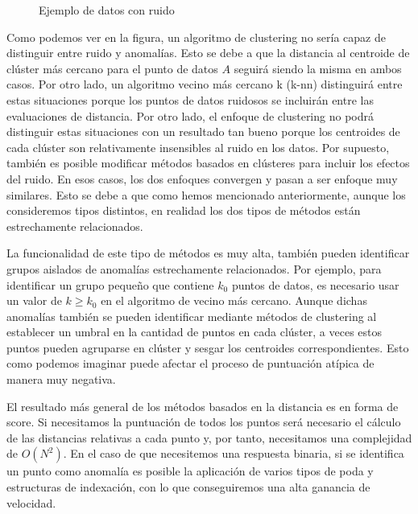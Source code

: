 \begin{figure}[h]
    \caption{\label{fig:my-label} Ejemplo de datos con ruido}
\end{figure}

Como podemos ver en la figura, un algoritmo de clustering no sería capaz de 
distinguir entre ruido y anomalías. Esto se debe a que la distancia al centroide 
de clúster más cercano para el punto de datos $A$ seguirá siendo la misma en 
ambos casos. Por otro lado, un algoritmo vecino más cercano k (k-nn) distinguirá entre 
estas situaciones porque los puntos de datos ruidosos se incluirán entre 
las evaluaciones de distancia. Por otro lado, el enfoque de clustering no 
podrá distinguir estas situaciones con un resultado tan bueno porque los 
centroides de cada clúster son relativamente insensibles al ruido en 
los datos. Por supuesto, también es posible modificar métodos basados en
clústeres para incluir los efectos del ruido. En esos casos, los dos
enfoques convergen y pasan a ser enfoque muy similares. Esto se debe a 
que como hemos mencionado anteriormente, aunque los consideremos tipos distintos,
en realidad los dos tipos de métodos están estrechamente relacionados.
 

La funcionalidad de este tipo de métodos es muy alta, también pueden 
identificar grupos aislados de anomalías estrechamente relacionados.
Por ejemplo, para identificar un grupo pequeño que contiene $k_0$
puntos de datos, es necesario usar un valor de $k \geq k_0$ en el algoritmo
de vecino más cercano. Aunque dichas anomalías también se pueden identificar
mediante métodos de clustering al establecer un umbral en la cantidad de
puntos en cada clúster, a veces estos puntos pueden agruparse en clúster 
y sesgar los centroides correspondientes. Esto como podemos imaginar puede 
afectar el proceso de puntuación atípica de manera muy negativa.


El resultado más general de los métodos basados en la distancia es en 
forma de score. Si necesitamos la puntuación de todos los puntos será
necesario el cálculo de las distancias relativas a cada punto y, por tanto,
necesitamos una complejidad de $O(N^{2})$. En el caso de que necesitemos una
respuesta binaria, si se identifica un punto como anomalía es posible la 
aplicación de varios tipos de poda y estructuras de indexación, con lo que
conseguiremos una alta ganancia de velocidad.


